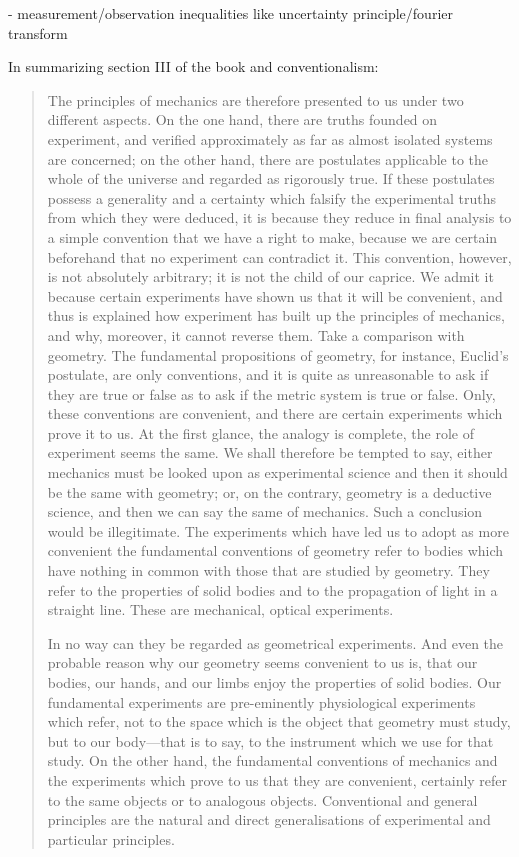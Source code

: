 \documentclass{article}
\begin{document}
  - measurement/observation inequalities like uncertainty principle/fourier transform
  
  In summarizing section III of the book and conventionalism:
 
 \begin{quote}
     The principles of mechanics are therefore presented to us under two different aspects.  On the one hand, there are truths founded on experiment, and verified approximately as far as almost isolated systems are concerned; on the other hand, there are postulates applicable to the whole of the universe and regarded as rigorously true.  If these postulates possess a generality and a certainty which falsify the experimental truths from which they were deduced, it is because they reduce in final analysis to a simple convention that we have a right to make, because we are certain beforehand that no experiment can contradict it.  This convention, however, is not absolutely arbitrary; it is not the child of our caprice.  We admit it because certain experiments have shown us that it will be convenient, and thus is explained how experiment has built up the principles of mechanics, and why, moreover, it cannot reverse them.  
     Take a comparison with geometry.  The fundamental propositions of geometry, for instance, Euclid's postulate, are only conventions, and it is quite as unreasonable to ask if they are true or false as to ask if the metric system is true or false.  Only, these conventions are convenient, and there are certain experiments which prove it to us.  At the first glance, the analogy is complete, the role of experiment seems the same.  We shall therefore be tempted to say, either mechanics must be looked upon as experimental science and then it should be the same with geometry; or, on the contrary, geometry is a deductive science, and then we can say the same of mechanics.  Such a conclusion would be illegitimate.  The experiments which have led us to adopt as more convenient the fundamental conventions of geometry refer to bodies which have nothing in common with those that are studied by geometry.  They refer to the properties of solid bodies and to the propagation of light in a straight line.  These are mechanical, optical experiments.  
     
     In no way can they be regarded as geometrical experiments.  And even the probable reason why our geometry seems convenient to us is, that our bodies, our hands, and our limbs enjoy the properties of solid bodies.  Our fundamental experiments are pre-eminently physiological experiments which refer, not to the space which is the object that geometry must study, but to our body---that is to say, to the instrument which we use for that study.  On the other hand, the fundamental conventions of mechanics and the experiments which prove to us that they are convenient, certainly refer to the same objects or to analogous objects.  Conventional and general principles are the natural and direct generalisations of experimental and particular principles.  \citep[p. 135-137]{Poincare1952}
 \end{quote}
 
\end{document}
